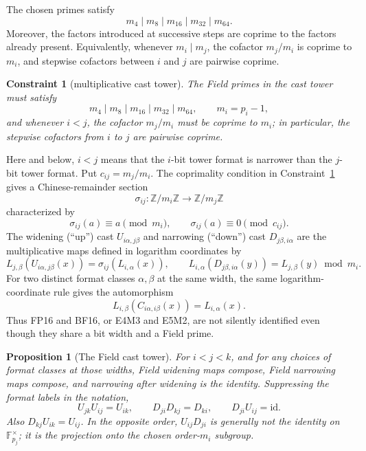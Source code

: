 \documentclass[11pt]{article}
\newcommand{\Z}{\mathbb{Z}}
\newcommand{\F}{\mathbb{F}}
\theoremstyle{plain}
\newtheorem{constraint}{Constraint}
\newtheorem{proposition}{Proposition}
\begin{document}
The chosen primes satisfy
\[
  m_4 \mid m_8 \mid m_{16} \mid m_{32} \mid m_{64}.
\]
Moreover, the factors introduced at successive steps are coprime to the factors
already present.  Equivalently, whenever \(m_i\mid m_j\), the cofactor
\(m_j/m_i\) is coprime to \(m_i\), and stepwise cofactors between \(i\) and
\(j\) are pairwise coprime.

\begin{constraint}[multiplicative cast tower]
\label{con:cast-tower}
The Field primes in the cast tower must satisfy
\[
  m_4 \mid m_8 \mid m_{16} \mid m_{32} \mid m_{64},
  \qquad m_i=p_i-1,
\]
and whenever \(i<j\), the cofactor \(m_j/m_i\) must be coprime to \(m_i\); in
particular, the stepwise cofactors from \(i\) to \(j\) are pairwise coprime.
\end{constraint}

Here and below, \(i<j\) means that the \(i\)-bit tower format is narrower than
the \(j\)-bit tower format.  Put \(c_{ij}=m_j/m_i\).  The coprimality condition
in Constraint~\ref{con:cast-tower} gives a Chinese-remainder section
\[
  \sigma_{ij}:\Z/m_i\Z\to\Z/m_j\Z
\]
characterized by
\[
  \sigma_{ij}(a)\equiv a\pmod {m_i},\qquad
  \sigma_{ij}(a)\equiv 0\pmod {c_{ij}}.
\]
The widening (``up'') cast \(U_{i\alpha,j\beta}\) and narrowing (``down'') cast
\(D_{j\beta,i\alpha}\) are the multiplicative maps defined in logarithm
coordinates by
\[
  L_{j,\beta}(U_{i\alpha,j\beta}(x))=\sigma_{ij}(L_{i,\alpha}(x)),\qquad
  L_{i,\alpha}(D_{j\beta,i\alpha}(y))=L_{j,\beta}(y)\bmod m_i.
\]
For two distinct format classes \(\alpha,\beta\) at the same width, the same
logarithm-coordinate rule gives the automorphism
\[
  L_{i,\beta}(C_{i\alpha,i\beta}(x))=L_{i,\alpha}(x).
\]
Thus FP16 and BF16, or E4M3 and E5M2, are not silently identified even
though they share a bit width and a Field prime.

\begin{proposition}[The Field cast tower]
\label{prop:field-casts}
For \(i<j<k\), and for any choices of format classes at those widths, Field
widening maps compose, Field narrowing maps compose, and narrowing after
widening is the identity.  Suppressing the format labels in the notation,
\[
  U_{jk}U_{ij}=U_{ik},\qquad
  D_{ji}D_{kj}=D_{ki},\qquad
  D_{ji}U_{ij}=\mathrm{id}.
\]
Also \(D_{kj}U_{ik}=U_{ij}\).  In the opposite order,
\(U_{ij}D_{ji}\) is generally not the identity on \(\F_{p_j}^{\times}\); it is
the projection onto the chosen order-\(m_i\) subgroup.
\end{proposition}
\end{document}
